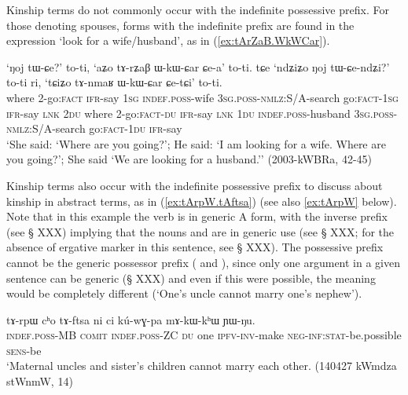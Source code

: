 Kinship terms do not commonly occur with the indefinite possessive prefix. For those denoting spouses, forms with the indefinite prefix are found in the expression `look for a wife/husband', as in (\ref{ex:tArZaB.WkWCar}).
 
\begin{exe}
\ex \label{ex:tArZaB.WkWCar}
 \gll `ŋoj tɯ-ɕe?' to-ti, `aʑo tɤ-rʑaβ ɯ-kɯ-ɕar ɕe-a' to-ti. tɕe `ndʑiʑo ŋoj tɯ-ɕe-ndʑi?' to-ti ri, `tɕiʑo tɤ-nmaʁ ɯ-kɯ-ɕar ɕe-tɕi' to-ti. \\
 where 2-go:\textsc{fact} \textsc{ifr}-say \textsc{1sg} \textsc{indef}.\textsc{poss}-wife \textsc{3sg}.\textsc{poss}-\textsc{nmlz}:S/A-search go:\textsc{fact}-\textsc{1sg} \textsc{ifr}-say \textsc{lnk} \textsc{2du} where 2-go:\textsc{fact}-\textsc{du} \textsc{ifr}-say \textsc{lnk} \textsc{1du} \textsc{indef}.\textsc{poss}-husband  \textsc{3sg}.\textsc{poss}-\textsc{nmlz}:S/A-search go:\textsc{fact}-\textsc{1du} \textsc{ifr}-say  \\
 \glt `She said: `Where are you going?'; He said: `I am looking for a wife. Where are you going?'; She said `We are looking for a husband.'' (2003-kWBRa, 42-45)
\end{exe}

Kinship terms also occur with the indefinite possessive prefix to discuss about kinship in abstract terms, as in (\ref{ex:tArpW.tAftsa}) (see also \ref{ex:tArpW} below). Note that in this example the verb is in generic A form, with the inverse prefix (see § XXX) implying that the nouns  and  are in generic use (see § XXX; for the absence of ergative marker in this sentence, see § XXX). The possessive prefix cannot be the generic possessor prefix  ( and ), since only one argument in a given sentence can be generic (§ XXX) and even if this were possible, the meaning would be completely different (`One's uncle cannot marry one's nephew').

\begin{exe}
\ex \label{ex:tArpW.tAftsa}
\gll tɤ-rpɯ cʰo tɤ-ftsa ni ci kú-wɣ-pa mɤ-kɯ-kʰɯ ɲɯ-ŋu. \\
\textsc{indef.poss}-MB \textsc{comit} \textsc{indef.poss}-ZC \textsc{du} one \textsc{ipfv}-\textsc{inv}-make \textsc{neg}-\textsc{inf}:\textsc{stat}-be.possible  \textsc{sens}-be \\
\glt `Maternal uncles and sister's children cannot marry each other.  (140427 kWmdza stWnmW, 14)
\end{exe}

